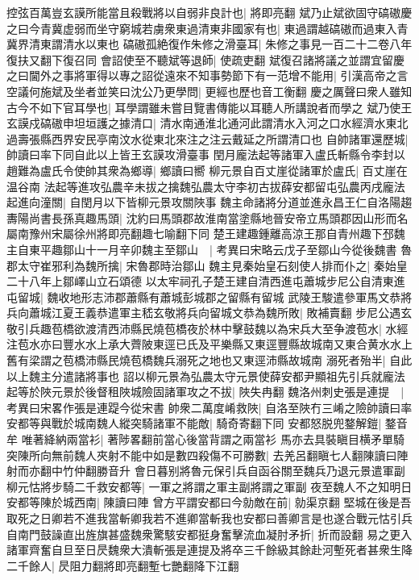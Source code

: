 控弦百萬豈玄謨所能當且殺戰將以自弱非良計也|{
	將即亮翻}
斌乃止斌欲固守碻磝慶之曰今青冀虚弱而坐守窮城若虜衆東過清東非國家有也|{
	東過謂越碻磝而過東入青冀界清東謂清水以東也}
碻磝孤絶復作朱修之滑臺耳|{
	朱修之事見一百二十二卷八年復扶又翻下復召同}
會詔使至不聽斌等退師|{
	使疏吏翻}
斌復召諸將議之並謂宜留慶之曰閫外之事將軍得以專之詔從遠來不知事勢節下有一范增不能用|{
	引漢高帝之言}
空議何施斌及坐者並笑曰沈公乃更學問|{
	更經也歷也音工衡翻}
慶之厲聲曰衆人雖知古今不如下官耳學也|{
	耳學謂雖未嘗目覽書傳能以耳聽人所講說者而學之}
斌乃使王玄謨戍碻磝申坦垣護之據清口|{
	清水南通淮北通河此謂清水入河之口水經濟水東北過壽張縣西界安民亭南汶水從東北來注之注云戴延之所謂清口也}
自帥諸軍還歷城|{
	帥讀曰率下同自此以上皆王玄謨攻滑臺事}
閏月龐法起等諸軍入盧氏斬縣令李封以趙難為盧氏令使帥其衆為鄉導|{
	鄉讀曰嚮}
柳元景自百丈崖從諸軍於盧氏|{
	百丈崖在温谷南}
法起等進攻弘農辛未拔之擒魏弘農太守李初古拔薛安都留屯弘農丙戌龐法起進向潼關|{
	自閏月以下皆柳元景攻關陜事}
魏主命諸將分道並進永昌王仁自洛陽趨夀陽尚書長孫真趣馬頭|{
	沈約曰馬頭郡故淮南當塗縣地晉安帝立馬頭郡因山形而名屬南豫州宋屬徐州將即亮翻趣七喻翻下同}
楚王建趣鍾離高涼王那自青州趣下邳魏主自東平趣鄒山十一月辛卯魏主至鄒山　|{
	考異曰宋略云戊子至鄒山今從後魏書}
魯郡太守崔邪利為魏所擒|{
	宋魯郡時治鄒山}
魏主見秦始皇石刻使人排而仆之|{
	秦始皇二十八年上鄒嶧山立石頌德}
以太牢祠孔子楚王建自清西進屯蕭城步尼公自清東進屯留城|{
	魏收地形志沛郡蕭縣有蕭城彭城郡之留縣有留城}
武陵王駿遣參軍馬文恭將兵向蕭城江夏王義恭遣軍主嵇玄敬將兵向留城文恭為魏所敗|{
	敗補賣翻}
步尼公遇玄敬引兵趣苞橋欲渡清西沛縣民燒苞橋夜於林中擊鼓魏以為宋兵大至争渡苞水|{
	水經注苞水亦曰豐水水上承大薺陂東逕已氏及平樂縣又東逕豐縣故城南又東合黄水水上舊有梁謂之苞橋沛縣民燒苞橋魏兵溺死之地也又東逕沛縣故城南}
溺死者殆半|{
	自此以上魏主分遣諸將事也}
詔以柳元景為弘農太守元景使薛安都尹顯祖先引兵就龐法起等於陜元景於後督租陜城險固諸軍攻之不拔|{
	陜失冉翻}
魏洛州刺史張是連提　|{
	考異曰宋畧作張是連踶今從宋書}
帥衆二萬度崤救陜|{
	自洛至陜冇三崤之險帥讀曰率}
安都等與戰於城南魏人縱突騎諸軍不能敵|{
	騎奇寄翻下同}
安都怒脱兜鍪解鎧|{
	鍪音牟}
唯著絳納兩當衫|{
	著陟畧翻前當心後當背謂之兩當衫}
馬亦去具裝瞋目横矛單騎突陳所向無前魏人夾射不能中如是數四殺傷不可勝數|{
	去羌呂翻瞋七人翻陳讀曰陣射而亦翻中竹仲翻勝音升}
會日暮别將魯元保引兵自函谷關至魏兵乃退元景遣軍副柳元怙將步騎二千救安都等|{
	一軍之將謂之軍主副將謂之軍副}
夜至魏人不之知明日安都等陳於城西南|{
	陳讀曰陣}
曾方平謂安都曰今勍敵在前|{
	勍渠京翻}
堅城在後是吾取死之日卿若不進我當斬卿我若不進卿當斬我也安都曰善卿言是也遂合戰元怙引兵自南門鼓譟直出旌旗甚盛魏衆驚駭安都挺身奮擊流血凝肘矛折|{
	折而設翻}
易之更入諸軍齊奮自旦至日昃魏衆大潰斬張是連提及將卒三千餘級其餘赴河塹死者甚衆生降二千餘人|{
	昃阻力翻將即亮翻塹七艷翻降下江翻}

